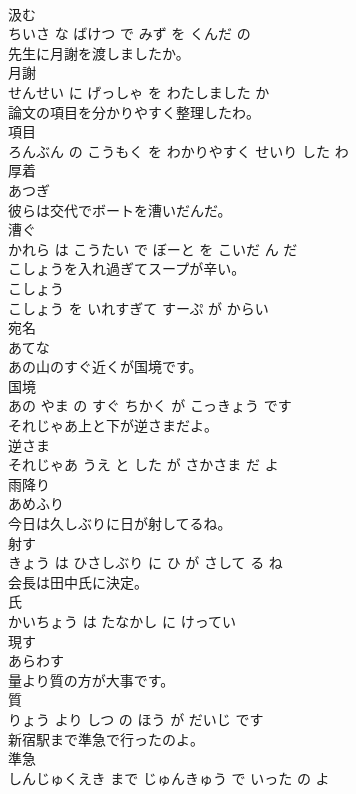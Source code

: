 \documentclass[8pt]{extreport}
\begin{document}
\begin{CJK}{UTF8}{min}
\\	汲む 
\\	ちいさ な ばけつ で みず を くんだ の			
\\	先生に月謝を渡しましたか。	
\\	月謝 
\\	せんせい に げっしゃ を わたしました か			
\\	論文の項目を分かりやすく整理したわ。	
\\	項目 
\\	ろんぶん の こうもく を わかりやすく せいり した わ			
\\	厚着	
\\	あつぎ			
\\	彼らは交代でボートを漕いだんだ。	
\\	漕ぐ 
\\	かれら は こうたい で ぼーと を こいだ ん だ			
\\	こしょうを入れ過ぎてスープが辛い。	
\\	こしょう 
\\	こしょう を いれすぎて すーぷ が からい			
\\	宛名	
\\	あてな			
\\	あの山のすぐ近くが国境です。	
\\	国境 
\\	あの やま の すぐ ちかく が こっきょう です			
\\	それじゃあ上と下が逆さまだよ。	
\\	逆さま 
\\	それじゃあ うえ と した が さかさま だ よ			
\\	雨降り	
\\	あめふり			
\\	今日は久しぶりに日が射してるね。	
\\	射す 
\\	きょう は ひさしぶり に ひ が さして る ね			
\\	会長は田中氏に決定。	
\\	氏 
\\	かいちょう は たなかし に けってい			
\\	現す	
\\	あらわす			
\\	量より質の方が大事です。	
\\	質 
\\	りょう より しつ の ほう が だいじ です			
\\	新宿駅まで準急で行ったのよ。	
\\	準急 
\\	しんじゅくえき まで じゅんきゅう で いった の よ			

\end{CJK}
\end{document}
